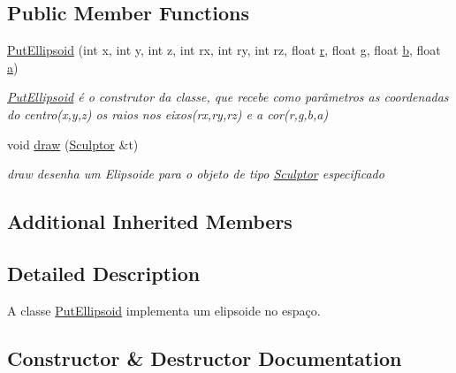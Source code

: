 \subsection*{Public Member Functions}
\begin{DoxyCompactItemize}
\item 
\hyperlink{class_put_ellipsoid_a52970ddea7bc1ff99835c06d190383b0}{Put\+Ellipsoid} (int x, int y, int z, int rx, int ry, int rz, float \hyperlink{class_figura_geometrica_a0a4f57efb1a6c525c8aeee34c92e7eab}{r}, float \hyperlink{class_figura_geometrica_a51930549bcb90d016b824f10f95df355}{g}, float \hyperlink{class_figura_geometrica_a25e5d6c21410103c25ec55c0117dac0d}{b}, float \hyperlink{class_figura_geometrica_ae7c8a027fcec3c357265b90458a4d165}{a})
\begin{DoxyCompactList}\small\item\em \hyperlink{class_put_ellipsoid}{Put\+Ellipsoid} é o construtor da classe, que recebe como parâmetros as coordenadas do centro(x,y,z) os raios nos eixos(rx,ry,rz) e a cor(r,g,b,a) \end{DoxyCompactList}\item 
void \hyperlink{class_put_ellipsoid_a961faff306dad93a4b68a35ad9c3027b}{draw} (\hyperlink{class_sculptor}{Sculptor} \&t)
\begin{DoxyCompactList}\small\item\em draw desenha um Elipsoide para o objeto de tipo \hyperlink{class_sculptor}{Sculptor} especificado \end{DoxyCompactList}\end{DoxyCompactItemize}
\subsection*{Additional Inherited Members}


\subsection{Detailed Description}
A classe \hyperlink{class_put_ellipsoid}{Put\+Ellipsoid} implementa um elipsoide no espaço. 

\subsection{Constructor \& Destructor Documentation}
\mbox{\label{class_put_ellipsoid_a52970ddea7bc1ff99835c06d190383b0}} 
